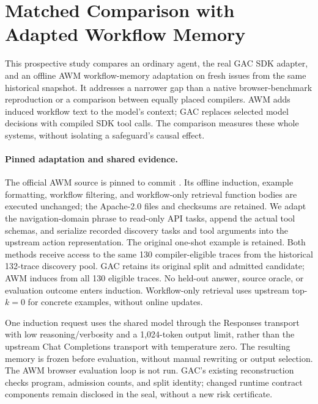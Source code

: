 \section{Matched Comparison with Adapted Workflow Memory}
\label{app:matched-reuse}

This prospective study compares an ordinary agent, the real GAC SDK adapter,
and an offline AWM workflow-memory adaptation \citep{wang2025awm} on fresh
issues from the same historical snapshot. It addresses a narrower gap than a
native browser-benchmark reproduction or a comparison between equally placed
compilers. AWM adds induced workflow text to the model's context; GAC replaces
selected model decisions with compiled SDK tool calls. The comparison measures
these whole systems, without isolating a safeguard's causal effect.

\paragraph{Pinned adaptation and shared evidence.}
The official AWM source is pinned to commit
. Its offline induction,
example formatting, workflow filtering, and workflow-only retrieval function
bodies are executed unchanged; the Apache-2.0 files and checksums are retained.
We adapt the navigation-domain phrase to read-only API tasks, append the actual
tool schemas, and serialize recorded discovery tasks and tool arguments into
the upstream action representation. The original one-shot example is retained.
Both methods receive access to the same 130 compiler-eligible traces from the
historical 132-trace discovery pool. GAC retains its original split and admitted
candidate; AWM induces from all 130 eligible traces. No held-out answer, source
oracle, or evaluation outcome enters induction. Workflow-only retrieval uses
upstream top-$k=0$ for concrete examples, without online updates.

One induction request uses the shared model through the Responses transport
with low reasoning/verbosity and a 1,024-token output limit, rather than the
upstream Chat Completions transport with temperature zero. The resulting memory
is frozen before evaluation, without manual rewriting or output selection.
The AWM browser evaluation loop is not run. GAC's existing reconstruction checks
program, admission counts, and split identity; changed runtime contract
components remain disclosed in the seal, without a new risk certificate.

